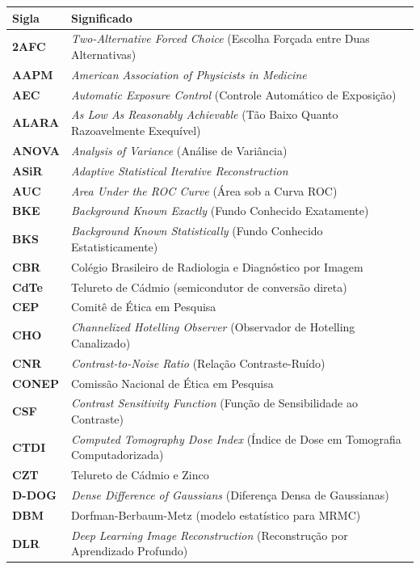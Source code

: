 \documentclass[
  12pt,
  a4paper,
  oneside
]{report}
\begin{document}
\begin{longtable}{ll}
\toprule
\textbf{Sigla} & \textbf{Significado} \\
\midrule
\endhead
\textbf{2AFC} & \emph{Two-Alternative Forced Choice} (Escolha Forçada entre Duas Alternativas) \\
\textbf{AAPM} & \emph{American Association of Physicists in Medicine} \\
\textbf{AEC} & \emph{Automatic Exposure Control} (Controle Automático de Exposição) \\
\textbf{ALARA} & \emph{As Low As Reasonably Achievable} (Tão Baixo Quanto Razoavelmente Exequível) \\
\textbf{ANOVA} & \emph{Analysis of Variance} (Análise de Variância) \\
\textbf{ASiR} & \emph{Adaptive Statistical Iterative Reconstruction} \\
\textbf{AUC} & \emph{Area Under the ROC Curve} (Área sob a Curva ROC) \\
\textbf{BKE} & \emph{Background Known Exactly} (Fundo Conhecido Exatamente) \\
\textbf{BKS} & \emph{Background Known Statistically} (Fundo Conhecido Estatisticamente) \\
\textbf{CBR} & Colégio Brasileiro de Radiologia e Diagnóstico por Imagem \\
\textbf{CdTe} & Telureto de Cádmio (semicondutor de conversão direta) \\
\textbf{CEP} & Comitê de Ética em Pesquisa \\
\textbf{CHO} & \emph{Channelized Hotelling Observer} (Observador de Hotelling Canalizado) \\
\textbf{CNR} & \emph{Contrast-to-Noise Ratio} (Relação Contraste-Ruído) \\
\textbf{CONEP} & Comissão Nacional de Ética em Pesquisa \\
\textbf{CSF} & \emph{Contrast Sensitivity Function} (Função de Sensibilidade ao Contraste) \\
\textbf{CTDI} & \emph{Computed Tomography Dose Index} (Índice de Dose em Tomografia Computadorizada) \\
\textbf{CZT} & Telureto de Cádmio e Zinco \\
\textbf{D-DOG} & \emph{Dense Difference of Gaussians} (Diferença Densa de Gaussianas) \\
\textbf{DBM} & Dorfman-Berbaum-Metz (modelo estatístico para MRMC) \\
\textbf{DLR} & \emph{Deep Learning Image Reconstruction} (Reconstrução por Aprendizado Profundo) \\

\end{longtable}
\end{document}
